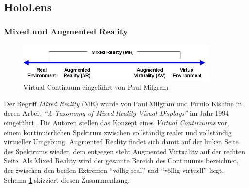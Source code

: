 \subsection{HoloLens}
\label{sec-2-1}

\subsubsection{Mixed und Augmented Reality}
\label{sec-2-1-1}

\begin{figure}[h!]
	\centering
	\includegraphics[width=0.9\textwidth]{images/virtual_continuum.png}
	\caption{Virtual Continuum eingeführt von Paul Milgram \cite{Milgram94}}
	\label{img:virtual_continuum}
\end{figure}

Der Begriff \textit{Mixed Reality} (MR) wurde von Paul Milgram und Fumio Kishino in deren Arbeit \textit{``A Taxonomy of Mixed Reality Visual Displays''} im Jahr 1994 eingeführt \cite{Milgram94}. Die Autoren stellen das Konzept eines \textit{Virtual Continuums} vor, einem kontinuierlichen Spektrum zwischen vollständig realer und vollständig virtueller Umgebung. Augmented Reality findet sich damit auf der linken Seite des Spektrums wieder, dem entgegen steht Augmented Virtuality auf der rechten Seite. Als Mixed Reality wird der gesamte Bereich des Continuums bezeichnet, der zwischen den beiden Extremen ``völlig real'' und ``völlig virtuell'' liegt. Schema \ref{img:virtual_continuum} skizziert diesen Zusammenhang.\\

